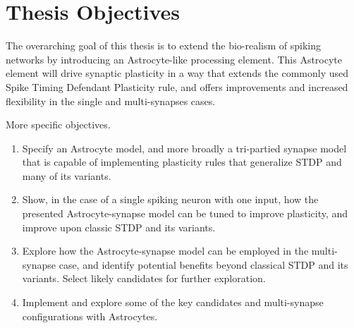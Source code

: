     \section{Thesis Objectives}
    The overarching goal of this thesis is to extend the bio-realism of spiking
    networks by introducing an Astrocyte-like processing element. This Astrocyte
    element will drive synaptic plasticity in a way that extends the commonly
    used Spike Timing Defendant Plasticity rule, and offers improvements and
    increased flexibility in the single and multi-synapses cases.

    More specific objectives.
    \begin{enumerate}
        \item Specify an Astrocyte model, and more broadly a tri-partied synapse
          model that is capable of implementing plasticity rules that generalize
          STDP and many of its variants.

        \item Show, in the case of a single spiking neuron with one input, how
          the presented Astrocyte-synapse model can be tuned to improve
          plasticity, and improve upon classic STDP and its variants.

        \item Explore how the Astrocyte-synapse model can be employed in the
          multi-synapse case, and identify potential benefits beyond classical
          STDP and its variants. Select likely candidates for further
          exploration.

        \item Implement and explore some of the key candidates and multi-synapse
          configurations with Astrocytes.
          
    \end{enumerate}

